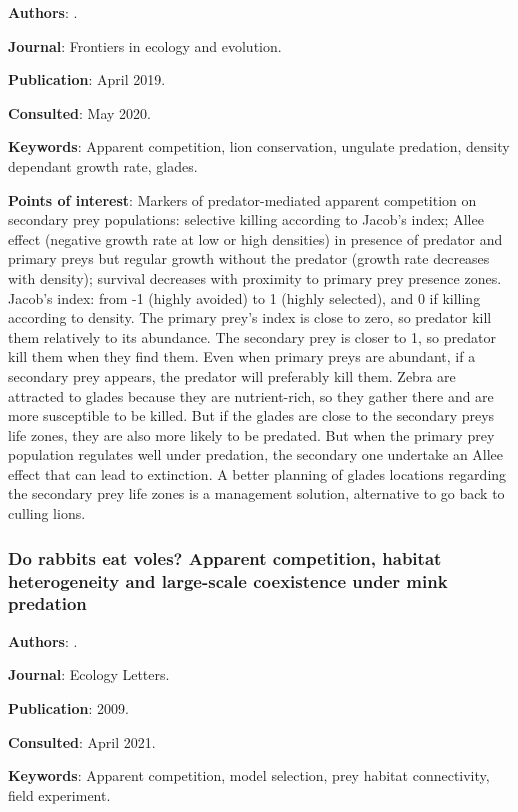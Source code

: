 \documentclass[12pt,a4paper]{article}
\begin{document}
\textbf{Authors}: \cite{ngweno2019apparent}.

\textbf{Journal}: Frontiers in ecology and evolution.

\textbf{Publication}: April 2019.

\textbf{Consulted}: May 2020.

\textbf{Keywords}: Apparent competition, lion conservation, ungulate predation, density dependant growth rate, glades.

\textbf{Points of interest}:
Markers of predator-mediated apparent competition on secondary prey populations: selective killing according to Jacob's index; Allee effect (negative growth rate at low or high densities) in presence of predator and primary preys but regular growth without the predator (growth rate decreases with density); survival decreases with proximity to primary prey presence zones.
Jacob's index: from -1 (highly avoided) to 1 (highly selected), and 0 if killing according to density.
The primary prey's index is close to zero, so predator kill them relatively to its abundance. The secondary prey is closer to 1, so predator kill them when they find them. Even when primary preys are abundant, if a secondary prey appears, the predator will preferably kill them.
Zebra are attracted to glades because they are nutrient-rich, so they gather there and are more susceptible to be killed. But if the glades are close to the secondary preys life zones, they are also more likely to be predated. But when the primary prey population regulates well under predation, the secondary one undertake an Allee effect that can lead to extinction.
A better planning of glades locations regarding the secondary prey life zones is a management solution, alternative to go back to culling lions.

\newpage

\subsubsection*{Do rabbits eat voles? Apparent competition, habitat heterogeneity and large-scale coexistence under mink predation}

\textbf{Authors}: \cite{oliver2009rabbits}.

\textbf{Journal}: Ecology Letters.

\textbf{Publication}: 2009.

\textbf{Consulted}: April 2021.

\textbf{Keywords}: Apparent competition, model selection, prey habitat connectivity, field experiment.
\end{document}
